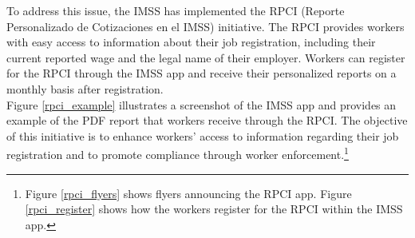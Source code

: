 \documentclass[10pt, oneside]{book}
\begin{document}
To address this issue, the IMSS has implemented the RPCI (Reporte Personalizado de Cotizaciones en el IMSS) initiative. The RPCI provides workers with easy access to information about their job registration, including their current reported wage and the legal name of their employer. Workers can register for the RPCI through the IMSS app and receive their personalized reports on a monthly basis after registration. \\

Figure \ref{rpci_example} illustrates a screenshot of the IMSS app and provides an example of the PDF report that workers receive through the RPCI. The objective of this initiative is to enhance workers' access to information regarding their job registration and to promote compliance through worker enforcement.\footnote{Figure \ref{rpci_flyers} shows flyers announcing the RPCI app. Figure \ref{rpci_register} shows how the workers register for the RPCI within the IMSS app.} \\ 
\end{document}
